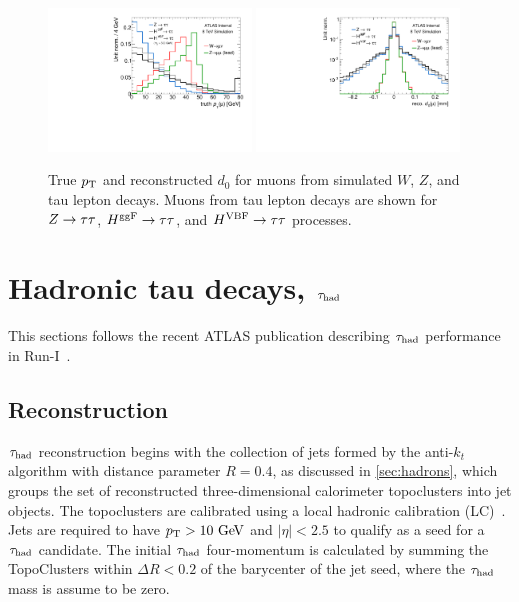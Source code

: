 \begin{figure}[tp]
  \centering
  \includegraphics[width=0.48\textwidth]{figures/tauperformance/leptonsfromtausaresoft}
  \includegraphics[width=0.48\textwidth]{figures/tauperformance/leptond0}
  \caption{True $p_{\mathrm{T}}$ and reconstructed $d_0$ for muons from simulated $W$, $Z$, and tau lepton decays. Muons from tau lepton decays are shown for $Z\rightarrow\tau\tau$, $H^{\text{ggF}}\rightarrow\tau\tau$, and $H^{\text{VBF}}\rightarrow\tau\tau$ processes.}
  \label{fig:taus-leptonpt}
\end{figure}


\section{Hadronic tau decays, $\tau_\text{had}$}
\label{sec:taus-hadrons}

This sections follows the recent ATLAS publication describing $\tau_\text{had}$ performance in Run-I~\cite{PERF-2013-06}.

\subsection{Reconstruction}

$\tau_\text{had}$ reconstruction begins with the collection of jets formed by the anti-$k_t$ algorithm with distance parameter $R=0.4$, as discussed in \cref{sec:hadrons}, which groups the set of reconstructed three-dimensional calorimeter topoclusters into jet objects. The topoclusters are calibrated using a local hadronic calibration (LC)~\cite{ATL-LARG-PUB-2009-001-2}. Jets are required to have $\pt > 10 \GeV$ and $|\eta| < 2.5$ to qualify as a seed for a $\tau_\text{had}$ candidate. The initial $\tau_\text{had}$ four-momentum is calculated by summing the TopoClusters within $\Delta R < 0.2$ of the barycenter of the jet seed, where the $\tau_\text{had}$ mass is assume to be zero.


